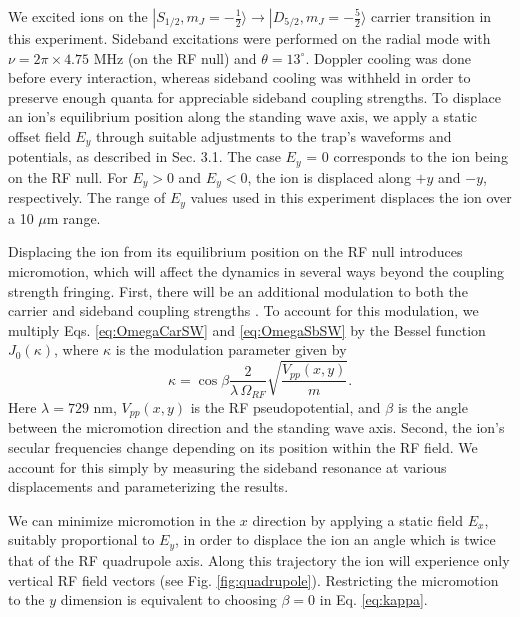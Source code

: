 We excited ions on the $|S_{1/2}, m_J = -\frac{1}{2} \rangle \rightarrow |D_{5/2}, m_J = -\frac{5}{2} \rangle$ carrier transition in this experiment. Sideband excitations were performed on the radial mode with $\nu=2\pi \times 4.75$ MHz (on the RF null) and $\theta = 13^{\circ}$. Doppler cooling was done before every interaction, whereas sideband cooling was withheld in order to preserve enough quanta for appreciable sideband coupling strengths. To displace an ion's equilibrium position along the standing wave axis, we apply a static offset field $E_y$ through suitable adjustments to the trap's waveforms and potentials, as described in Sec. 3.1. The case $E_y$ = 0 corresponds to the ion being on the RF null. For $E_y>0$ and $E_y<0$, the ion is displaced along $+y$ and $-y$, respectively. The range of $E_y$ values used in this experiment displaces the ion over a 10 $\mu$m range. %

Displacing the ion from its equilibrium position on the RF null introduces micromotion, which will affect the dynamics in several ways beyond the coupling strength fringing. First, there will be an additional modulation to both the carrier and sideband coupling strengths \cite{Berkeland98.JAP.83.5025}. To account for this modulation, we multiply Eqs. \ref{eq:OmegaCarSW} and \ref{eq:OmegaSbSW} by the Bessel function $J_0(\kappa)$, where $\kappa$ is the modulation parameter given by
\begin{equation}
\label{eq:kappa}
\kappa = \cos \beta \frac{2}{\lambda\, \Omega_{RF}} \sqrt{ \frac{V_{pp}(x,y)}{m}  } .
\end{equation}
Here $\lambda = 729$ nm, $V_{pp}(x,y)$ is the RF pseudopotential, and $\beta$ is the angle between the micromotion direction and the standing wave axis.  Second, the ion's secular frequencies change depending on its position within the RF field. We account for this simply by measuring the sideband resonance at various displacements and parameterizing the results.

We can minimize micromotion in the $x$ direction by applying a static field $E_x$, suitably proportional to $E_y$, in order to displace the ion an angle which is twice that of the RF quadrupole axis. Along this trajectory the ion will experience only vertical RF field vectors (see Fig. \ref{fig:quadrupole}). Restricting the micromotion to the $y$ dimension is equivalent to choosing $\beta = 0$ in Eq. \ref{eq:kappa}.

